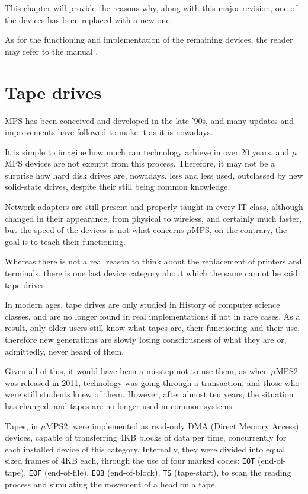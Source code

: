\documentclass[12pt,a4paper,openright,twoside]{report}
\begin{document}
This chapter will provide the reasons why, along with this major revision, one of the devices has been replaced with a new one.

As for the functioning and implementation of the remaining devices, the reader may refer to the manual \cite{pops}.

\section{Tape drives}
MPS has been conceived and developed in the late '90s, and many updates and improvements have followed to make it as it is nowadays.

It is simple to imagine how much can technology achieve in over 20 years, and $\mu$MPS devices are not exempt from this process.
Therefore, it may not be a surprise how hard disk drives are, nowadays, less and less used, outclassed by new solid-state drives, despite their still being common knowledge.

Network adapters are still present and properly taught in every IT class, although changed in their appearance, from physical to wireless, and certainly much faster, but the speed of the devices is not what concerns $\mu$MPS, on the contrary, the goal is to teach their functioning.

Whereas there is not a real reason to think about the replacement of printers and terminals, there is one last device category about which the same cannot be said: tape drives.

In modern ages, tape drives are only studied in History of computer science classes, and are no longer found in real implementations if not in rare cases.
As a result, only older users still know what tapes are, their functioning and their use, therefore new generations are slowly losing consciousness of what they are or, admittedly, never heard of them.

Given all of this, it would have been a misstep not to use them, as when $\mu$MPS2 was released in 2011, technology was going through a transaction, and those who were still students knew of them.
However, after almost ten years, the situation has changed, and tapes are no longer used in common systems.

Tapes, in $\mu$MPS2, were implemented as read-only DMA (Direct Memory Access) devices, capable of transferring 4KB blocks of data per time, concurrently for each installed device of this category.
Internally, they were divided into equal sized frames of 4KB each, through the use of four marked codes: \texttt{EOT} (end-of-tape), \texttt{EOF} (end-of-file), \texttt{EOB} (end-of-block), \texttt{TS} (tape-start), to scan the reading process and simulating the movement of a head on a tape.
\end{document}
